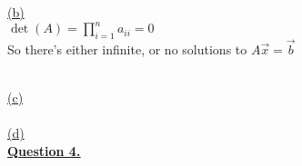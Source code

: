 \documentclass[12pt]{article}
\begin{document}




\newpage\hyperlink{toc}{\hypertarget{3.2}{(b)}}\\
$\det(A) = \prod_{i=1}^{n}a_{ii} = 0$\\
So there's either infinite, or no solutions to $A\vec{x} = \vec{b}$

\noindent ~\\\hyperlink{toc}{\hypertarget{3.3}{(c)}}\\
\noindent ~\\\hyperlink{toc}{\hypertarget{3.4}{(d)}}\\

\newpage
\noindent \hyperlink{toc}{\hypertarget{4}{\LARGE \underline{\textbf{Question 4.}}}}\\\\
\end{document}
